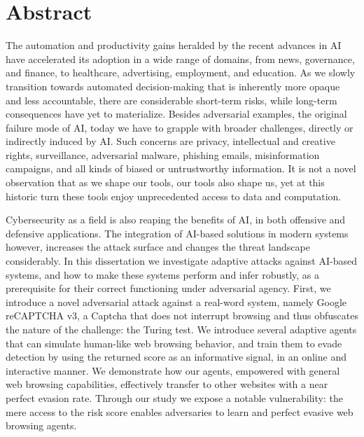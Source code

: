 \chapter{Abstract}
\label{ch:abstract}

The automation and productivity gains heralded by the recent advances in \gls{AI} have accelerated its adoption in a wide range of domains, from news, governance, and finance, to healthcare, advertising, employment, and education.
As we slowly transition towards automated decision-making that is inherently more opaque and less accountable, there are considerable short-term risks, while long-term consequences have yet to materialize.
Besides adversarial examples, the original failure mode of \gls{AI}, today we have to grapple with broader challenges, directly or indirectly induced by \gls{AI}.
Such concerns are privacy, intellectual and creative rights, surveillance, adversarial malware, phishing emails, misinformation campaigns, and all kinds of biased or untrustworthy information.
It is not a novel observation that as we shape our tools, our tools also shape us, yet at this historic turn these tools enjoy unprecedented access to data and computation.

Cybersecurity as a field is also reaping the benefits of \gls{AI}, in both offensive and defensive applications.
The integration of AI-based solutions in modern systems however, increases the attack surface and changes the threat landscape considerably.
In this dissertation we investigate adaptive attacks against AI-based systems, and how to make these systems perform and infer robustly, as a prerequisite for their correct functioning under adversarial agency.
First, we introduce a novel adversarial attack against a real-word system, namely Google reCAPTCHA v3, a Captcha that does not interrupt browsing and thus obfuscates the nature of the challenge: the Turing test.
We introduce several adaptive agents that can simulate human-like web browsing behavior, and train them to evade detection by using the returned score as an informative signal, in an online and interactive manner.
We demonstrate how our agents, empowered with general web browsing capabilities, effectively transfer to other websites with a near perfect evasion rate.
Through our study we expose a notable vulnerability: the mere access to the risk score enables adversaries to learn and perfect evasive web browsing agents.

